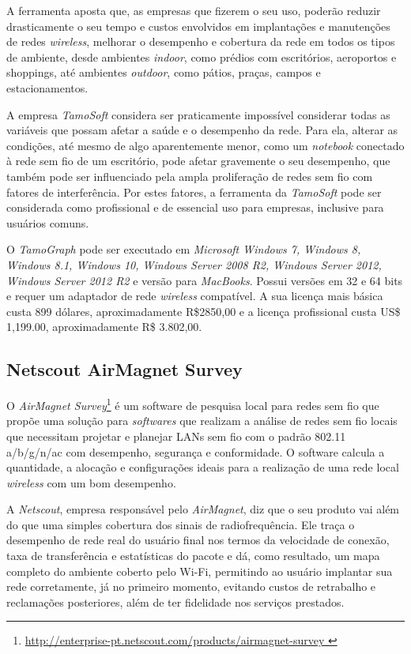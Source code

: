 \documentclass[
	12pt,				%
	openright,			%
	twoside,			%
	a4paper,			%
	english,			%
	french,				%
	spanish,			%
	brazil				%
	]{abntex2}
\begin{document}
A ferramenta aposta que, as empresas que fizerem o seu uso, poderão reduzir drasticamente o seu tempo e custos envolvidos em implantações e manutenções de redes \textit{wireless}, melhorar o desempenho e cobertura da rede em todos os tipos de ambiente, desde ambientes \textit{indoor}, como prédios com escritórios, aeroportos e shoppings, até ambientes \textit{outdoor}, como pátios, praças, campos e estacionamentos.

A empresa \textit{TamoSoft} considera ser praticamente impossível considerar todas as variáveis que possam afetar a saúde e o desempenho da rede. Para ela, alterar as condições, até mesmo de algo aparentemente menor, como um \textit{notebook} conectado à rede sem fio de um escritório, pode afetar gravemente o seu desempenho, que também pode ser influenciado pela ampla proliferação de redes sem fio com fatores de interferência. Por estes fatores, a ferramenta da \textit{TamoSoft} pode ser considerada como profissional e de essencial uso para empresas, inclusive para usuários comuns.

O \textit{TamoGraph} pode ser executado em \textit{Microsoft Windows 7, Windows 8, Windows 8.1, Windows 10, Windows Server 2008 R2, Windows Server 2012, Windows Server 2012 R2} e versão para \textit{MacBooks}. Possui versões em 32 e 64 bits e requer um adaptador de rede \textit{wireless} compatível. A sua licença mais básica custa 899 dólares, aproximadamente R\$2850,00 e a licença profissional custa US\$ 1,199.00, aproximadamente R\$ 3.802,00.


\subsection[Netscout AirMagnet Survey]{Netscout AirMagnet Survey}

O \textit{AirMagnet Survey}\footnote{\url{http://enterprise-pt.netscout.com/products/airmagnet-survey }} é um software de pesquisa local para redes sem fio que propõe uma solução para \textit{softwares} que realizam a análise de redes sem fio locais que necessitam projetar e planejar LANs sem fio com o padrão 802.11  a/b/g/n/ac com desempenho, segurança e conformidade. O software calcula a quantidade, a alocação e configurações ideais para a realização de uma rede local \textit{wireless} com um bom desempenho.

A \textit{Netscout}, empresa responsável pelo \textit{AirMagnet}, diz que o seu produto vai além do que uma simples cobertura dos sinais de radiofrequência. Ele traça o desempenho de rede real do usuário final nos termos da velocidade de conexão, taxa de transferência e estatísticas do pacote e dá, como resultado, um mapa completo do ambiente coberto pelo Wi-Fi, permitindo ao usuário implantar sua rede corretamente, já no primeiro momento, evitando custos de retrabalho e reclamações posteriores, além de ter fidelidade nos serviços prestados.
\end{document}
